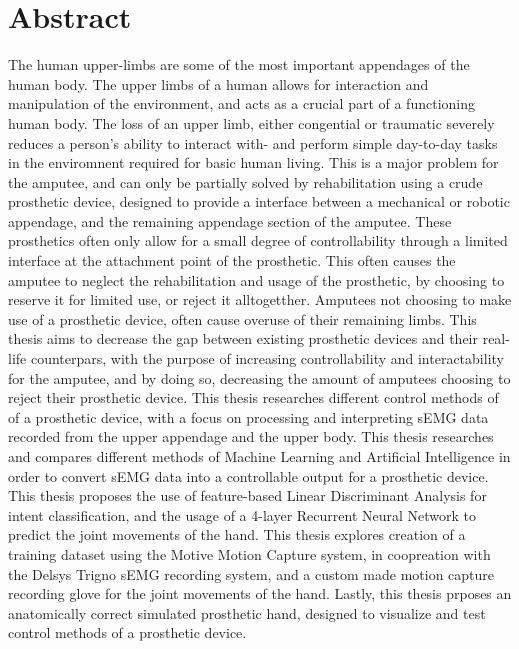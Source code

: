\documentclass[../main.tex]{subfiles}
\begin{document}
\section*{Abstract}

The human upper-limbs are some of the most important appendages of the human body.
The upper limbs of a human allows for interaction and manipulation of the environment, and acts as a crucial part of a functioning human body.
The loss of an upper limb, either congential or traumatic severely reduces a person's ability to interact with- and perform simple day-to-day tasks in the enviromnent required for basic human living.
This is a major problem for the amputee, and can only be partially solved by rehabilitation using a crude prosthetic device, designed to provide a interface between a mechanical or robotic appendage, and the remaining appendage section of the amputee.
These prosthetics often only allow for a small degree of controllability through a limited interface at the attachment point of the prosthetic.
This often causes the amputee to neglect the rehabilitation and usage of the prosthetic, by choosing to reserve it for limited use, or reject it alltogetther.
Amputees not choosing to make use of a prosthetic device, often cause overuse of their remaining limbs.
This thesis aims to decrease the gap between existing prosthetic devices and their real-life counterpars, with the purpose of increasing controllability and interactability for the amputee, and by doing so, decreasing the amount of amputees choosing to reject their prosthetic device. 
This thesis researches different control methods of of a prosthetic device, with a focus on processing and interpreting sEMG data recorded from the upper appendage and the upper body.
This thesis researches and compares different methods of Machine Learning and Artificial Intelligence in order to convert sEMG data into a controllable output for a prosthetic device.
This thesis proposes the use of feature-based Linear Discriminant Analysis for intent classification, and the usage of a 4-layer Recurrent Neural Network to predict the joint movements of the hand.
This thesis explores creation of a training dataset using the Motive Motion Capture system, in coopreation with the Delsys Trigno sEMG recording system, and a custom made motion capture recording glove for the joint movements of the hand.
Lastly, this thesis prposes an anatomically correct simulated prosthetic hand, designed to visualize and test control methods of a prosthetic device.


\end{document}
